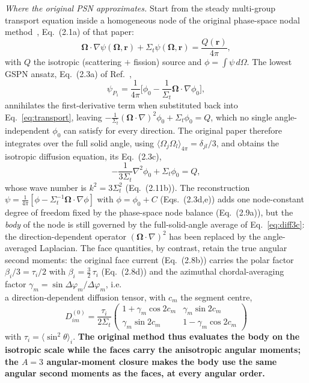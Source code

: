 \documentclass[11pt,a4paper]{article}
\begin{document}
\emph{Where the original PSN approximates.}
Start from the steady multi-group transport equation inside a
homogeneous node of the original phase-space nodal method~\cite{psn2027},
Eq.~(2.1a) of that paper:
\begin{equation}
\boldsymbol{\Omega}\cdot\nabla\psi(\boldsymbol{\Omega},\mathbf{r})
+\Sigma_t\psi(\boldsymbol{\Omega},\mathbf{r}) = \frac{Q(\mathbf{r})}{4\pi},
\label{eq:transport}
\end{equation}
with $Q$ the isotropic (scattering $+$ fission) source and
$\phi=\int\psi\,d\Omega$. The lowest GSPN ansatz, Eq.~(2.3a) of
Ref.~\cite{psn2027},
\begin{equation}
\psi_{P_1} = \frac{1}{4\pi}\Big[\phi_0
-\frac{1}{\Sigma_t}\boldsymbol{\Omega}\cdot\nabla\phi_0\Big],
\end{equation}
annihilates the first-derivative term when substituted back into
Eq.~\eqref{eq:transport}, leaving
$-\frac{1}{\Sigma_t}(\boldsymbol{\Omega}\cdot\nabla)^2\phi_0
+\Sigma_t\phi_0 = Q$, which no single angle-independent
$\phi_0$ can satisfy for every direction. The original paper therefore
integrates over the full solid angle, using
$\langle\Omega_j\Omega_l\rangle_{4\pi}=\delta_{jl}/3$, and obtains the
isotropic diffusion equation, its Eq.~(2.3c),
\begin{equation}
-\frac{1}{3\Sigma_t}\nabla^2\phi_0+\Sigma_t\phi_0 = Q,
\label{eq:diff3c}
\end{equation}
whose wave number is $k^2 = 3\Sigma_t^2$ (Eq.~(2.11b)). The reconstruction
$\psi = \frac{1}{4\pi}[\phi - \Sigma_t^{-1}\boldsymbol{\Omega}\cdot\nabla\phi]$
with $\phi=\phi_0+C$ (Eqs.~(2.3d,e)) adds one node-constant degree of
freedom fixed by the phase-space node balance (Eq.~(2.9a)), but the
\emph{body} of the node is still governed by the full-solid-angle
average of Eq.~\eqref{eq:diff3c}: the direction-dependent operator
$(\boldsymbol{\Omega}\cdot\nabla)^2$ has been replaced by the
angle-averaged Laplacian. The face quantities, by contrast, retain the
true angular second moments: the original face current
(Eq.~(2.8b)) carries the polar factor
$\beta_i/3=\tau_i/2$ with $\beta_i=\tfrac32\,\tau_i$
(Eq.~(2.8d)) and the azimuthal
chordal-averaging factor $\gamma_m=\sin\Delta\varphi_m/\Delta\varphi_m$,
i.e.\\ a direction-dependent diffusion tensor, with
$c_m$ the segment centre,
\[
D^{(0)}_{im} = \frac{\tau_i}{2\Sigma_t}
\begin{pmatrix}
1+\gamma_m\cos 2c_m & \gamma_m\sin 2c_m\\
\gamma_m\sin 2c_m & 1-\gamma_m\cos 2c_m
\end{pmatrix}
\]
with $\tau_i=\langle\sin^2\theta\rangle_i$.
\textbf{The original
method thus evaluates the body on the isotropic scale while the faces
carry the anisotropic angular moments; the $A{=}3$ angular-moment closure
makes the body use the same angular second moments as the faces, at
every angular order.}
\end{document}
